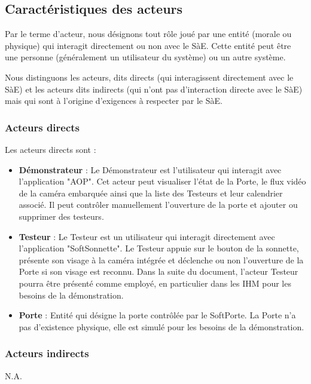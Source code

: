 \newpage
\subsection{Caractéristiques des acteurs}

Par le terme d’acteur, nous désignons tout rôle joué par une entité (morale ou physique) qui interagit directement ou non avec le SàE. 
Cette entité peut être une personne (généralement un utilisateur du système) ou un autre système.

Nous distinguons les acteurs, dits directs (qui interagissent directement avec le SàE) et les acteurs dits indirects (qui n’ont pas d’interaction directe avec le SàE) mais qui sont à l’origine d’exigences à respecter par le SàE.

\subsubsection{Acteurs directs} 

Les acteurs directs sont : 
\begin{itemize}
    \item \textbf{Démonstrateur} : Le Démonstrateur est l'utilisateur qui interagit avec l'application "AOP". 
    Cet acteur peut visualiser l'état de la Porte, le flux vidéo de la caméra embarquée ainsi que la liste des Testeurs et leur calendrier associé.
    Il peut contrôler manuellement l'ouverture de la porte et ajouter ou supprimer des testeurs.
    \item \textbf{Testeur} : Le Testeur est un utilisateur qui interagit directement avec l'application "SoftSonnette".
    Le Testeur appuie sur le bouton de la sonnette, présente son visage à la caméra intégrée et déclenche ou non l'ouverture de la Porte si son visage est reconnu.
    Dans la suite du document, l'acteur Testeur pourra être présenté comme employé, en particulier dans les IHM pour les besoins de la démonstration.
    \item \textbf{Porte} : Entité qui désigne la porte contrôlée par le SoftPorte.
    La Porte n'a pas d'existence physique, elle est simulé pour les besoins de la démonstration.
\end{itemize}

\subsubsection{Acteurs indirects}

N.A.